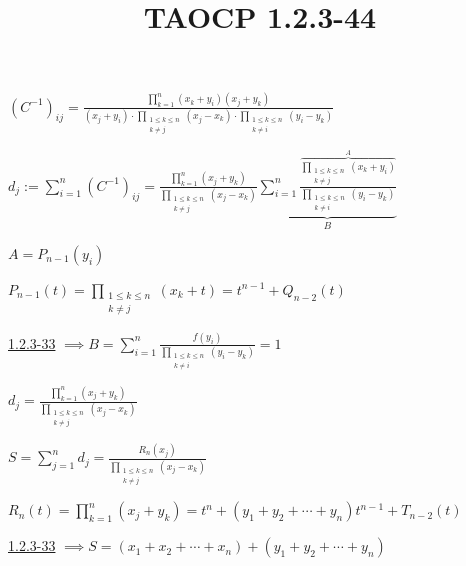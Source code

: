 \documentclass{article}
\title{TAOCP 1.2.3\mbox{-}44}
\begin{document}
\maketitle

\( {(C^{-1})}_{ij} = \frac{\prod_{k=1}^{n}(x_{k} + y_{i})(x_{j}+y_{k})}{(x_{j}+y_{i}) \cdot \prod_{\substack{1 \leq k \leq n\\ k \neq j}} (x_{j}-x_{k}) \cdot \prod_{\substack{1 \leq k \leq n\\ k \neq i}} (y_{i}-y_{k})} \)

\( d_{j} := \sum_{i=1}^{n} {(C^{-1})}_{ij} = \frac{\prod_{k=1}^{n} (x_{j}+y_{k})}{\prod_{\substack{1 \leq k \leq n\\ k \neq j}} (x_{j}-x_{k})} \underbrace{\sum_{i=1}^{n}\frac{\overbrace{\prod_{\substack{1 \leq k \leq n\\k \neq j}}(x_{k} + y_{i})}^{A}}{\prod_{\substack{1 \leq k \leq n\\ k \neq i}} (y_{i}-y_{k})}}_{B} \)

\( A = P_{n-1}(y_{i}) \)

\( P_{n-1}(t) = \prod_{\substack{1 \leq k \leq n\\k \neq j}}(x_{k} + t) = t^{n-1} + Q_{n-2}(t) \)

\href{./1.2.3-33.pdf}{1.2.3\mbox{-}33} \( \implies B = \sum_{i=1}^{n}\frac{f(y_{i})}{\prod_{\substack{1 \leq k \leq n\\ k \neq i}} (y_{i}-y_{k})} = 1 \)

\( d_{j} = \frac{\prod_{k=1}^{n} (x_{j}+y_{k})}{\prod_{\substack{1 \leq k \leq n\\ k \neq j}} (x_{j}-x_{k})} \)

\( S = \sum_{j=1}^{n} d_{j} = \frac{R_{n}(x_{j})}{\prod_{\substack{1 \leq k \leq n\\ k \neq j}} (x_{j}-x_{k})} \)

\( R_{n}(t) = \prod_{k=1}^{n} (x_{j}+y_{k}) = t^{n} + (y_{1}+y_{2}+\cdots+y_{n})t^{n-1} + T_{n-2}(t) \)

\href{./1.2.3-33.pdf}{1.2.3\mbox{-}33} \( \implies S = (x_{1}+x_{2}+\cdots+x_{n}) + (y_{1}+y_{2}+\cdots+y_{n}) \)
\end{document}
